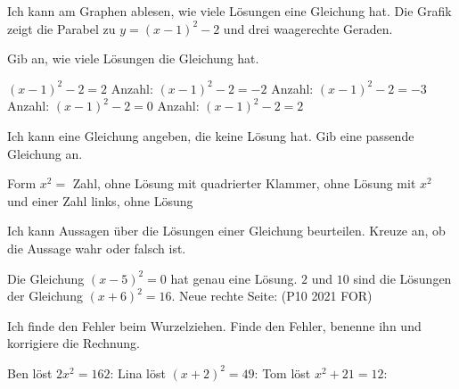 \begin{aufgabe}{Ich kann am Graphen ablesen, wie viele Lösungen eine Gleichung hat.}
Die Grafik zeigt die Parabel zu $y = (x - 1)^2 - 2$ und drei waagerechte Geraden.

\begin{ksys}[xmin=-3,xmax=5,ymin=-4,ymax=6,ablesen]
\end{ksys}

Gib an, wie viele Lösungen die Gleichung hat.
\begin{teile}
\teil $(x - 1)^2 - 2 = 2$ \hfill Anzahl: \leerfeld
\teil $(x - 1)^2 - 2 = -2$ \hfill Anzahl: \leerfeld
\teil $(x - 1)^2 - 2 = -3$ \hfill Anzahl: \leerfeld
\teil $(x - 1)^2 - 2 = 0$ \hfill Anzahl: \leerfeld
{}
\teil $(x - 1)^2 - 2 = 2$ \hfill {} \quad {}
\end{teile}
\end{aufgabe}

\begin{aufgabe}{Ich kann eine Gleichung angeben, die keine Lösung hat.}
Gib eine passende Gleichung an.
\begin{teile}
\teil Form $x^2 = $ Zahl, ohne Lösung \hfill \leerfeld
\teil mit quadrierter Klammer, ohne Lösung \hfill \leerfeld
\teil mit $x^2$ und einer Zahl links, ohne Lösung \hfill \leerfeld
\end{teile}
\end{aufgabe}

\begin{aufgabe}{Ich kann Aussagen über die Lösungen einer Gleichung beurteilen.}
Kreuze an, ob die Aussage wahr oder falsch ist.
\begin{teile}
\teil Die Gleichung $(x - 5)^2 = 0$ hat genau eine Lösung. \hfill {} \quad {}
\teil $2$ und $10$ sind die Lösungen der Gleichung $(x + 6)^2 = 16$. \hfill {} \quad {}
\teil Neue rechte Seite: \leerfeld \quad (P10 2021 FOR)
\end{teile}
\end{aufgabe}

\begin{aufgabe}{Ich finde den Fehler beim Wurzelziehen.}
Finde den Fehler, benenne ihn und korrigiere die Rechnung.
\begin{teile}
\teil Ben löst $2x^2 = 162$:
\teil Lina löst $(x + 2)^2 = 49$:
\teil Tom löst $x^2 + 21 = 12$:
\end{teile}
\end{aufgabe}

